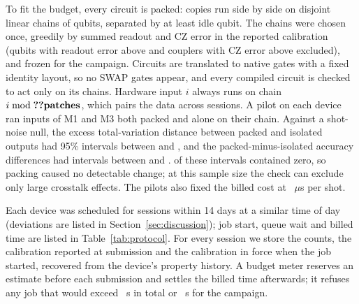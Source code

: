 To fit the budget, every circuit is packed:  copies run side by side on disjoint
linear chains of  qubits, separated by at least  idle qubit. The
chains were chosen once, greedily by summed readout and CZ error in the reported calibration
(qubits with readout error above  and couplers with CZ error above
 excluded), and frozen for the campaign. Circuits are translated to native
gates with a fixed identity layout, so no SWAP gates appear, and every compiled circuit is
checked to act only on its chains. Hardware input $i$ always runs on chain $i \bmod
\val{patches}$, which pairs the data across sessions. A pilot on each device ran
 inputs of M1 and M3 both packed and alone on their chain. Against a
shot-noise null, the excess total-variation distance between packed and isolated outputs had
95\% intervals between  and , and the
packed-minus-isolated accuracy differences had intervals between  and
.  of these intervals contained zero, so packing caused
no detectable change; at this sample size the check can exclude only large crosstalk effects.
The pilots also fixed the billed cost at ~$\mu$s per shot.

Each device was scheduled for  sessions within 14 days at a similar time
of day (deviations are listed in Section~\ref{sec:discussion}); job start, queue wait and billed time are listed in Table~\ref{tab:protocol}. For
every session we store the counts, the calibration reported at submission and the calibration
in force when the job started, recovered from the device's property history. A budget meter
reserves an estimate before each submission and settles the billed time afterwards; it refuses
any job that would exceed ~s in total or ~s for the campaign.

